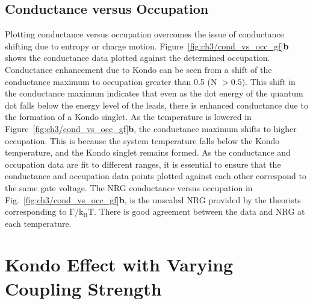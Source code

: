 \subsection{Conductance versus Occupation}

Plotting conductance versus occupation overcomes the issue of conductance shifting due to entropy or charge motion. Figure~\ref{fig:ch3/cond_vs_occ_gf}\textbf{b} shows the conductance data plotted against the determined occupation. Conductance enhancement due to Kondo can be seen from a shift of the conductance maximum to occupation greater than 0.5 (N $>0.5$). This shift in the conductance maximum indicates that even as the dot energy of the quantum dot falls below the energy level of the leads, there is enhanced conductance due to the formation of a Kondo singlet. As the temperature is lowered in Figure~\ref{fig:ch3/cond_vs_occ_gf}\textbf{b}, the conductance maximum shifts to higher occupation. This is because the system temperature falls below the Kondo temperature, and the Kondo singlet remains formed. As the conductance and occupation data are fit to different ranges, it is essential to ensure that the conductance and occupation data points plotted against each other correspond to the same gate voltage. The NRG conductance versus occupation in Fig.~\ref{fig:ch3/cond_vs_occ_gf}\textbf{b}, is the unscaled NRG provided by the theorists corresponding to $\mathrm{\Gamma/k_BT}$. There is good agreement between the data and NRG at each temperature. 



\section{Kondo Effect with Varying Coupling Strength}



